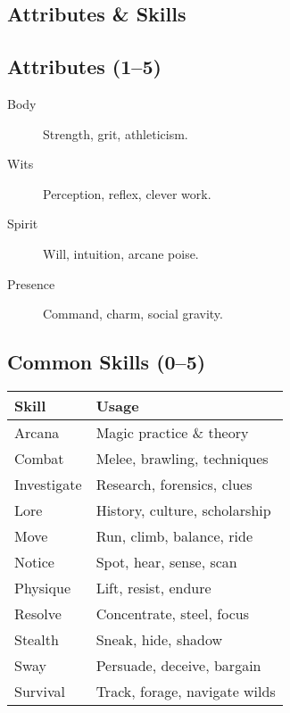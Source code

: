 \begin{multicols}{2}
\section{Attributes \& Skills}

\subsection*{Attributes (1–5)}
\begin{description}
  \item[Body] Strength, grit, athleticism.
  \item[Wits] Perception, reflex, clever work.
  \item[Spirit] Will, intuition, arcane poise.
  \item[Presence] Command, charm, social gravity.
\end{description}

\subsection*{Common Skills (0–5)}
\begin{center}
\begin{tabular}{ll}
\toprule
\textbf{Skill} & \textbf{Usage} \\
\midrule
Arcana & Magic practice \& theory \\
Combat & Melee, brawling, techniques \\
Investigate & Research, forensics, clues \\
Lore & History, culture, scholarship \\
Move & Run, climb, balance, ride \\
Notice & Spot, hear, sense, scan \\
Physique & Lift, resist, endure \\
Resolve & Concentrate, steel, focus \\
Stealth & Sneak, hide, shadow \\
Sway & Persuade, deceive, bargain \\
Survival & Track, forage, navigate wilds \\
\bottomrule
\end{tabular}
\end{center}


\end{multicols}

